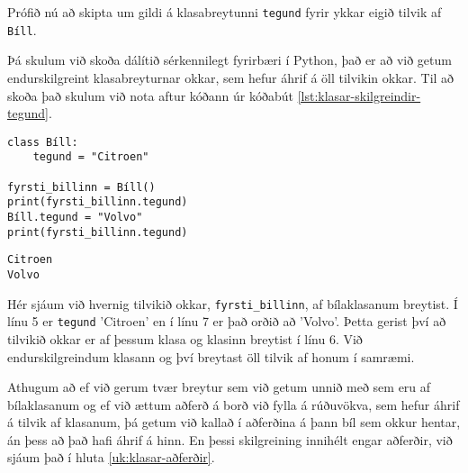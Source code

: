 Prófið nú að skipta um gildi á klasabreytunni \texttt{tegund} fyrir ykkar eigið tilvik af \texttt{Bíll}.

Þá skulum við skoða dálítið sérkennilegt fyrirbæri í Python, það er að við getum endurskilgreint klasabreyturnar okkar, sem hefur áhrif á öll tilvikin okkar.
Til að skoða það skulum við nota aftur kóðann úr kóðabút \ref{lst:klasar-skilgreindir-tegund}.

\begin{lstlisting}[caption=Endurskilgreining á því sem klasinn býður upp á, label=lst:klasar-skilgreindir-tegund2]
class Bíll:
	tegund = "Citroen"
	
fyrsti_billinn = Bíll()
print(fyrsti_billinn.tegund)
Bíll.tegund = "Volvo"
print(fyrsti_billinn.tegund)
\end{lstlisting}
\lstset{style=uttak}
\begin{lstlisting}
Citroen
Volvo
\end{lstlisting}
\lstset{style=venjulegt}

Hér sjáum við hvernig tilvikið okkar, \texttt{fyrsti\_billinn}, af bílaklasanum breytist.
Í línu 5 er \texttt{tegund} 'Citroen' en í línu 7 er það orðið að 'Volvo'.
Þetta gerist því að tilvikið okkar er af þessum klasa og klasinn breytist í línu 6.
Við endurskilgreindum klasann og því breytast öll tilvik af honum í samræmi.

Athugum að ef við gerum tvær breytur sem við getum unnið með sem eru af bílaklasanum og ef við ættum aðferð á borð við fylla á rúðuvökva, sem hefur áhrif á tilvik af klasanum, þá getum við kallað í aðferðina á þann bíl sem okkur hentar, án þess að það hafi áhrif á hinn.
En þessi skilgreining innihélt engar aðferðir, við sjáum það í hluta  \ref{uk:klasar-aðferðir}.


